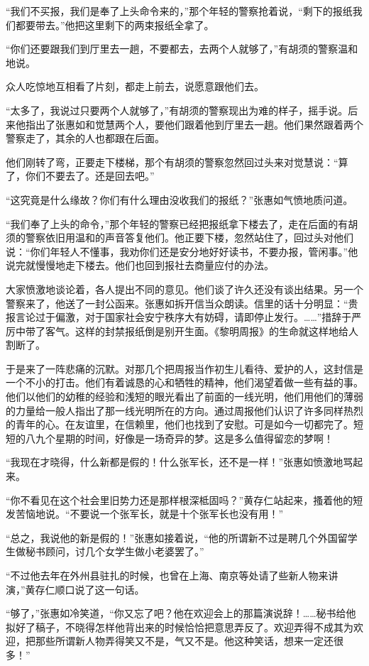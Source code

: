\par “我们不买报，我们是奉了上头命令来的，”那个年轻的警察抢着说，“剩下的报纸我们都要带去。”他把这里剩下的两束报纸全拿了。
\par “你们还要跟我们到厅里去一趟，不要都去，去两个人就够了，”有胡须的警察温和地说。
\par 众人吃惊地互相看了片刻，都走上前去，说愿意跟他们去。
\par “太多了，我说过只要两个人就够了，”有胡须的警察现出为难的样子，摇手说。后来他指出了张惠如和觉慧两个人，要他们跟着他到厅里去一趟。他们果然跟着两个警察走了，其余的人也都跟在后面。
\par 他们刚转了弯，正要走下楼梯，那个有胡须的警察忽然回过头来对觉慧说：“算了，你们不要去了。还是回去吧。”
\par “这究竟是什么缘故？你们有什么理由没收我们的报纸？”张惠如气愤地质问道。
\par “我们奉了上头的命令，”那个年轻的警察已经把报纸拿下楼去了，走在后面的有胡须的警察依旧用温和的声音答复他们。他正要下楼，忽然站住了，回过头对他们说：“你们年轻人不懂事，我劝你们还是安分地好好读书，不要办报，管闲事。”他说完就慢慢地走下楼去。他们也回到报社去商量应付的办法。
\par 大家愤激地谈论着，各人提出不同的意见。他们谈了许久还没有谈出结果。另一个警察来了，他送了一封公函来。张惠如拆开信当众朗读。信里的话十分明显：“贵报言论过于偏激，对于国家社会安宁秩序大有妨碍，请即停止发行。……”措辞于严厉中带了客气。这样的封禁报纸倒是别开生面。《黎明周报》的生命就这样地给人割断了。
\par 于是来了一阵悲痛的沉默。对那几个把周报当作初生儿看待、爱护的人，这封信是一个不小的打击。他们有着诚恳的心和牺牲的精神，他们渴望着做一些有益的事。他们以他们的幼稚的经验和浅短的眼光看出了前面的一线光明，他们用他们的薄弱的力量给一般人指出了那一线光明所在的方向。通过周报他们认识了许多同样热烈的青年的心。在友谊里，在信赖里，他们也找到了安慰。可是如今一切都完了。短短的八九个星期的时间，好像是一场奇异的梦。这是多么值得留恋的梦啊！
\par “我现在才晓得，什么新都是假的！什么张军长，还不是一样！”张惠如愤激地骂起来。
\par “你不看见在这个社会里旧势力还是那样根深柢固吗？”黄存仁站起来，搔着他的短发苦恼地说。“不要说一个张军长，就是十个张军长也没有用！”
\par “总之，我说他的新是假的！”张惠如接着说，“他的所谓新不过是聘几个外国留学生做秘书顾问，讨几个女学生做小老婆罢了。”
\par “不过他去年在外州县驻扎的时候，也曾在上海、南京等处请了些新人物来讲演，”黄存仁顺口说了这一句话。
\par “够了，”张惠如冷笑道，“你又忘了吧？他在欢迎会上的那篇演说辞！……秘书给他拟好了稿子，不晓得怎样他背出来的时候恰恰把意思弄反了。欢迎弄得不成其为欢迎，把那些所谓新人物弄得笑又不是，气又不是。他这种笑话，想来一定还很多！”
